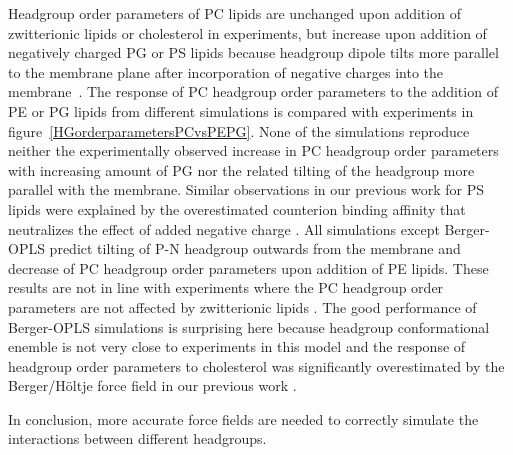 \documentclass[journal=jpcbfk]{achemso}
\begin{document}
Headgroup order parameters of PC lipids are unchanged upon addition
of zwitterionic lipids or cholesterol in experiments, but increase
upon addition of negatively charged PG or PS lipids because
headgroup dipole tilts more parallel to the membrane plane after incorporation
of negative charges into the membrane~\cite{seelig87, scherer87,antila18}.
The response of PC headgroup order parameters to the addition of PE or PG lipids
from different simulations is compared with experiments in figure~\ref{HGorderparametersPCvsPEPG}.
None of the simulations reproduce neither the experimentally observed increase in PC headgroup order parameters
with increasing amount of PG nor the related tilting of the headgroup more parallel with the membrane.
Similar observations in our previous work for PS lipids were explained by the overestimated counterion
binding affinity that neutralizes the effect of added negative charge \cite{antila19}.
All simulations except Berger-OPLS predict tilting of P-N headgroup outwards from the membrane and
decrease of PC headgroup order parameters upon addition of PE lipids.
These results are not in line with experiments where the PC headgroup order parameters are not affected by zwitterionic lipids \cite{scherer87}.
The good performance of Berger-OPLS simulations is surprising here because
headgroup conformational enemble is not very close to experiments in this model and
the response of headgroup order parameters
to cholesterol was significantly overestimated by the Berger/H{\"o}ltje force field in our previous work \cite{botan15}.

In conclusion, more accurate force fields are needed to correctly simulate the interactions between different headgroups.

\clearpage
\end{document}
